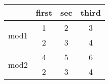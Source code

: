 \documentclass{article}
\begin{document}
\begin{tabular}{cccc|}
\cline{2-4}
&\multicolumn{1}{|c}{first}&sec &third \\ \hline
\multicolumn{1}{|c|}{\multirow{2}{*}{mod1}}&1& 2& 3 \\
\multicolumn{1}{|c|}{}&2&3&4\\\hline
\multicolumn{1}{|c|}{\multirow{2}{*}{mod2}}&4&5&6 \\
\multicolumn{1}{|c|}{}&2&3&4\\ \hline
\end{tabular}
\end{document}
